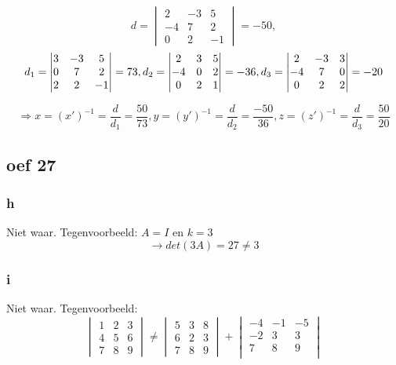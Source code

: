 \documentclass[10pt,a4paper]{article}
\begin{document}
\[  d = \begin{vmatrix}
            2 & -3 & 5\\
            -4 & 7 & 2\\
            0 & 2 & -1
    \end{vmatrix} = -50,\]
\[  d_1 = \begin{vmatrix}
        3 & -3 & 5\\
        0 & 7 & 2\\
        2 & 2 & -1
    \end{vmatrix} = 73,\\
    d_2 = \begin{vmatrix}
        2 & 3 & 5\\
        -4 & 0 & 2\\
        0 & 2 & 1
    \end{vmatrix} = -36,\\
    d_3 = \begin{vmatrix}
        2 & -3 & 3\\
        -4 & 7 & 0\\
        0 & 2 & 2
    \end{vmatrix} = -20
\]

\[\Rightarrow x = (x')^{-1}= \frac{d}{d_1} = \frac{50}{73},
    y = (y')^{-1}= \frac{d}{d_2} = \frac{-50}{36},
    z = (z')^{-1}= \frac{d}{d_3} = \frac{50}{20}
\]


\subsection*{oef 27}
\subsubsection*{h}
Niet waar. Tegenvoorbeeld: $A=I$ en $k=3$
\[
\rightarrow det(3A) = 27 \neq 3
\]
\subsubsection*{i}
Niet waar. Tegenvoorbeeld: 
\[
    \begin{vmatrix}
        1 & 2 & 3\\
        4 & 5 & 6\\
        7 & 8 & 9
    \end{vmatrix} \neq
    \begin{vmatrix}
        5 & 3 & 8\\
        6 & 2 & 3\\
        7 & 8 & 9
    \end{vmatrix} + 
    \begin{vmatrix}
        -4 & -1 & -5\\
        -2 & 3 & 3\\
        7 & 8 & 9\\
    \end{vmatrix}
\]
\end{document}
